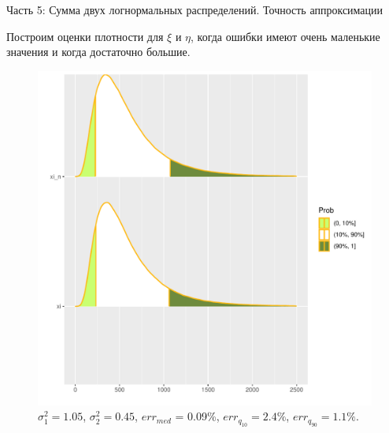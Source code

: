 \documentclass[ucs, notheorems, handout]{beamer}
\begin{document}
\begin{frame}{Часть 5: Сумма двух логнормальных распределений. Точность аппроксимации}
	
	Построим оценки плотности для $\xi$ и $\eta$, когда ошибки имеют очень маленькие значения и когда достаточно большие.
	
	\begin{figure}[h]
		\begin{center}
			\begin{minipage}[h]{0.4\linewidth}
				\includegraphics[width=1\linewidth]{img/par_2.pdf}
				\caption{$\sigma_{1}^{2} = 1.05$, $\sigma_{2}^{2} = 0.45$, $err_{med}$ = 0.09\%,  $err_{q_{10}} = 2.4\%$,  $err_{q_{90}} = 1.1\%$. } %
				\label{ris7} %
			\end{minipage}
			
		\end{center}
	\end{figure}
	
\end{frame}
\end{document}

